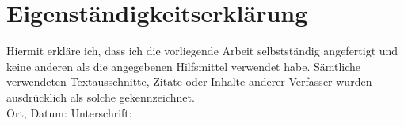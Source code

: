 \newpage
\section*{Eigenständigkeitserklärung}
Hiermit erkläre ich, dass ich die vorliegende Arbeit selbstständig angefertigt und keine anderen als die
angegebenen Hilfsmittel verwendet habe. Sämtliche verwendeten Textausschnitte, Zitate oder Inhalte anderer Verfasser wurden ausdrücklich als solche gekennzeichnet.\\
Ort, Datum: \hspace{6cm} Unterschrift:
\newpage